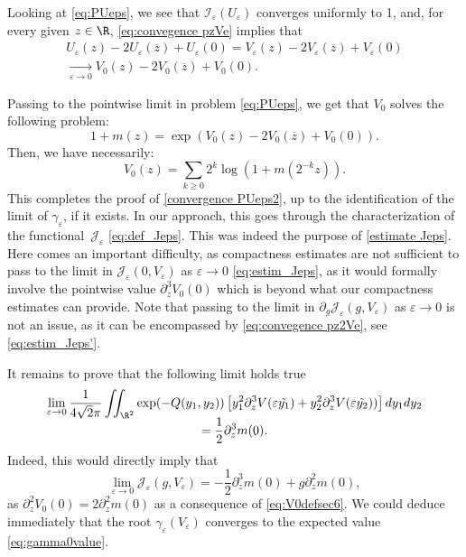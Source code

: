 \documentclass[JEP,XML,SOM,Unicode]{cedram}
\let\mathcal\mathscr
\newcommand{\cI}{\mathcal{I}}
\theoremstyle{plain}
\theoremstyle{definition}
\newcommand{\Je}{\mathcal{J}_\eps}
\let\eps\varepsilon
\let\ds\displaystyle
\newcommand{\bz}{\overline{z}}
\begin{document}
Looking at \eqref{eq:PUeps}, we see that $\cI_\eps(U_\eps)$ converges uniformly to 1, and, for every given $z\in \R$, \eqref{eq:convegence pzVe} implies that
\begin{multline}\label{eq:vareq_V}
U_\eps(z)-2U_\eps(\bz) + U_\eps(0) = V_\eps(z)-2V_\eps(\bz) + V_\eps(0)\\ \xrightarrow[\eps \to 0]{} V_0(z)-2V_0(\bz) + V_0(0).
\end{multline}

Passing to the pointwise limit in problem \eqref{eq:PUeps}, we get that $V_0$ solves the following problem:
\begin{equation*}
1 + m(z) = \exp \left(V_0(z)-2 V_0(\bz) + V_0(0) \right).
\end{equation*}
Then, we have necessarily:
\begin{equation}\label{eq:V0defsec6}
V_0(z) = \ds \sum_{k\geq 0} 2^k \log \left(1 + m(2^{-k}z) \right).
\end{equation}
This completes the proof of \eqref{convergence PUeps2}, up to the identification of the limit of $\gamma_\eps$, if it exists. In our approach, this goes through the characterization of the functional~$\Je$ \eqref{eq:def_Jeps}. This was indeed the purpose of \cref{estimate Jeps}. Here comes an important difficulty, as compactness estimates are not sufficient to pass to the limit in $\Je(0,V_\eps)$ as $\eps\to0$ \eqref{eq:estim_Jeps}, as it would formally involve the pointwise value $\partial_z^3V_0(0)$ which is beyond what our compactness estimates can provide. Note that passing to the limit in $\partial_g\Je(g,V_\eps)$ as $\eps\to0$ is not an issue, as it can be encompassed by \eqref{eq:convegence pz2Ve}, see \eqref{eq:estim_Jeps'}.

It remains to prove that the following limit holds true
\begin{multline}\label{eq:limV3}
\lim_{\eps \to 0}\dfrac{1}{4\sqrt{2}\pi} \iint _{\R^2} \exp(-Q (y_1,y_2)) \left[ y_1^2 \partial_z^3 V(\eps \tilde{y_1}) + y_2^2 \partial_z^3 V(\eps \tilde{y_2})) \right] dy_1dy_2\\[-5pt]
= \dfrac12 \partial_z^3m(0).
\end{multline}
Indeed, this would directly imply that
\begin{equation*}
\lim_{\eps\to 0} \Je(g,V_\eps) = - \dfrac{1}2\partial_z^3m(0) + g \partial_z^2m(0) ,
\end{equation*}
as $\partial_z^2 V_0(0) = 2\partial_z^2 m(0)$ as a consequence of \eqref{eq:V0defsec6}. We could deduce immediately that the root $\gamma_\eps(V_\eps)$ converges to the expected value \eqref{eq:gamma0value}.
\end{document}
